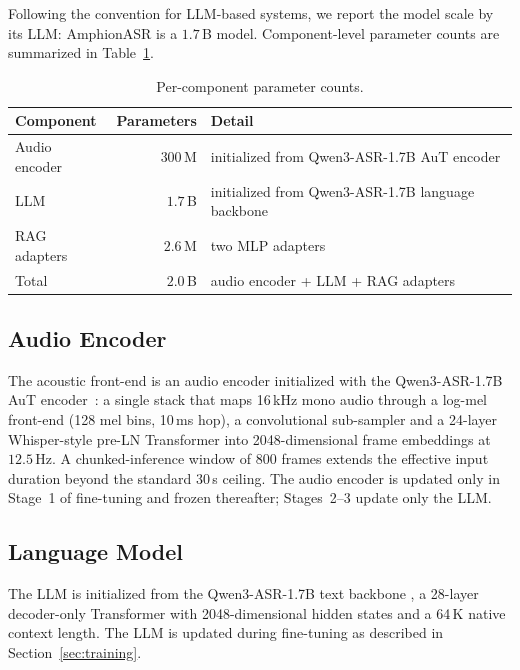 Following the convention for LLM-based systems, we report the model
scale by its LLM: AmphionASR is a $1.7$\,B model.
Component-level parameter counts are summarized in
Table~\ref{tab:params}.

\begin{table}[t]
  \caption{Per-component parameter counts.}
  \label{tab:params}
  \centering
  \small
  \begin{tabular}{lrl}
    \toprule
    Component & Parameters & Detail \\
    \midrule
    Audio encoder               & $300$\,M     & initialized from Qwen3-ASR-1.7B AuT encoder \\
    LLM                         & $1.7$\,B & initialized from Qwen3-ASR-1.7B language backbone \\
    RAG adapters                 & $2.6$\,M & two MLP adapters \\
    \midrule
    Total                      & $2.0$\,B & audio encoder + LLM + RAG adapters \\
    \bottomrule
  \end{tabular}
\end{table}

\subsection{Audio Encoder}
\label{subsec:audio-encoder}

The acoustic front-end is an audio encoder initialized with the
Qwen3-ASR-1.7B AuT encoder~\cite{qwen2025qwen3asr}: a single stack that maps 16\,kHz mono audio
through a log-mel front-end (128 mel bins, 10\,ms hop), a
convolutional sub-sampler and a 24-layer Whisper-style pre-LN
Transformer into 2048-dimensional frame embeddings at
$12.5$\,Hz.
A chunked-inference window of 800 frames extends the effective input
duration beyond the standard 30\,s ceiling.
The audio encoder is updated only in Stage~1 of fine-tuning and frozen
thereafter; Stages~2--3 update only the LLM.

\subsection{Language Model}
\label{subsec:llm}

The LLM is initialized from the Qwen3-ASR-1.7B text backbone \cite{qwen2025qwen3asr},
a 28-layer decoder-only Transformer with 2048-dimensional hidden
states and a 64\,K native context length. The LLM is updated during
fine-tuning as described in Section~\ref{sec:training}.

